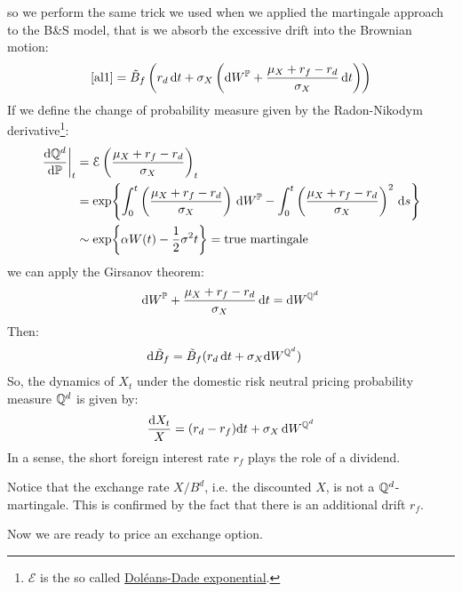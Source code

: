 so we perform the same trick we used when we applied the martingale approach to the B\&S model, that is we absorb the excessive drift into the Brownian motion:
\begin{equation}\label{al2}
    \eqref{al1} = \Tilde{B}_f\left(r_d\,\dd t + \sigma_X\left(\dd W^{\mathbb{P}} + \dfrac{\mu_X + r_f-r_d}{\sigma_X}\,\dd t\right)\right)
\end{equation}
If we define the change of probability measure given by the Radon-Nikodym derivative\footnote{$\mathcal{E}$ is the so called \href{https://en.wikipedia.org/wiki/Dol\%C3\%A9ans-Dade\_exponential}{Doléans-Dade exponential}.}:
\begin{align}
    \notag\eval{\frac{\dd \Qmeas^d}{\dd \Pmeas}}_t &= \mathcal{E}\left(\dfrac{\mu_X + r_f-r_d}{\sigma_X}\right)_t \\
    &=
    \notag\exp{\int_0^t \left(\dfrac{\mu_X + r_f-r_d}{\sigma_X}\right)\,\dd W^{\Pmeas} - \int_0^t \left(\dfrac{\mu_X + r_f-r_d}{\sigma_X}\right)^2\,\dd s} \\
    &\sim
    \exp{\alpha W(t) - \frac{1}{2}\sigma^2 t} = \text{true martingale}
\end{align}
we can apply the Girsanov theorem:
\begin{equation*}
    \dd W^{\mathbb{P}} + \dfrac{\mu_X + r_f-r_d}{\sigma_X}\,\dd t = \dd W^{\mathbb{Q}^d}
\end{equation*}
Then:
\begin{align}
    \dd\Tilde{B}_f &= \Tilde{B}_f(r_d\,\dd t + \sigma_X\dd W^{\mathbb{Q}^d})
\end{align}
So, the dynamics of $X_t$ under the domestic risk neutral pricing probability measure $\mathbb{Q}^d$ is given by:
\begin{equation}\label{dynX}
    \dfrac{\dd X_t}{X} = (r_d - r_f)\dd t + \sigma_X\,\dd W^{\mathbb{Q}^d}
\end{equation}
In a sense, the short foreign interest rate $r_f$ plays the role of a dividend.
\begin{remark}
    Notice that the exchange rate $X/B^d$, i.e. the discounted $X$, is not a $\mathbb{Q}^d$-martingale. This is confirmed by the fact that there is an additional drift $r_f$.
\end{remark} %
Now we are ready to price an exchange option.
